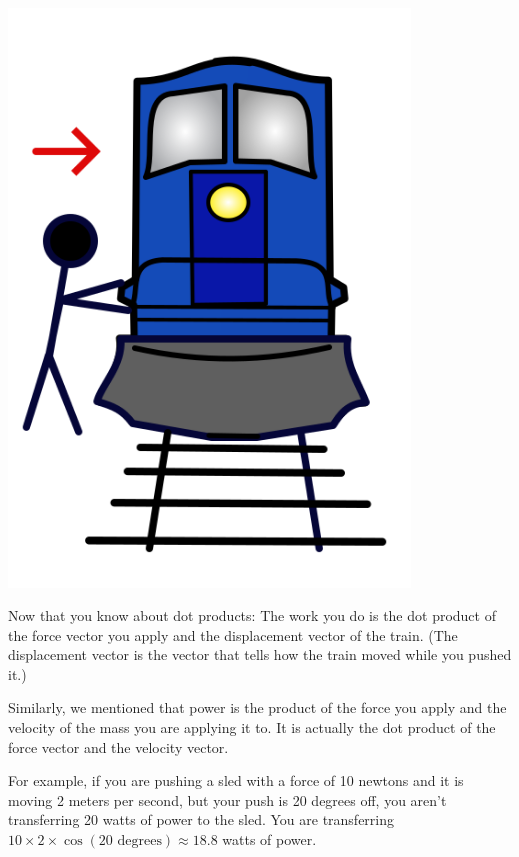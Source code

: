 \includegraphics[width=0.8\textwidth]{train.png}


Now that you know about dot products: The work you do is the dot
product of the force vector you apply and the displacement vector of the train. (The displacement
vector is the vector that tells how the train moved while you pushed it.) 

Similarly, we mentioned that power is the product of the force you apply and the velocity of the
mass you are applying it to. It is actually the dot product of the force vector and the velocity vector.

For example, if you are pushing a sled with a force of 10 newtons and it is moving 2 meters per second, 
but your push is 20 degrees off, you aren't transferring 20 watts of power to the sled.  
You are transferring $10 \times 2 \times \cos(20 \text{ degrees}) \approx 18.8$ watts of power.
